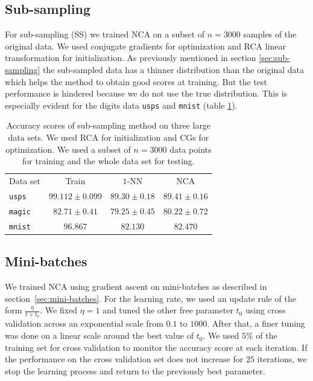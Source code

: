   \subsection{Sub-sampling}
  \label{subsec:eval-sub-sampling}

    For sub-sampling (SS) we trained NCA on a subset of $n=3000$ samples of the original data. We used conjugate gradients for optimization and RCA linear transformation for initialization. As previously mentioned in section \ref{sec:sub-sampling} the sub-sampled data has a thinner distribution than the original data which helps the method to obtain good scores at training. But the test performance is hindered because we do not use the true distribution. This is especially evident for the digits data \texttt{usps} and \texttt{mnist} (table \ref{tab:ss}). 
    \begin{table}
    	\centering
    	\begin{tabular}{lccc}
    	\toprule
    	Data set & Train & $1$-NN & NCA \\
    	\cmidrule(r){2-2}\cmidrule(r){3-3}\cmidrule(r){4-4} 
    	 \texttt{usps}&$99.112 \pm 0.099$&$89.30 \pm 0.18$&$89.41 \pm 0.16$\\
    	 \texttt{magic}&$82.71 \pm 0.41$&$79.25 \pm 0.45$&$80.22 \pm 0.72$\\
    	 \texttt{mnist}&$96.867$&$82.130$&$82.470$\\
    	 \bottomrule
    	\end{tabular}
	\label{tab:ss}
	\caption{Accuracy scores of sub-sampling method on three large data sets. We used RCA for initialization and CGs for optimization. We used a subset of $n=3000$ data points for training and the whole data set for testing.}
    \end{table}

    \subsection{Mini-batches}
    \label{subsec:eval-mini-batches}

    We trained NCA using gradient ascent on mini-batches as described in section~\ref{sec:mini-batches}. For the learning rate, we used an update rule of the form $\frac{\eta}{t+t_0}$. We fixed $\eta=1$ and tuned the other free parameter $t_0$ using cross validation across an exponential scale from $0.1$ to $1000$. After that, a finer tuning was done on a linear scale around the best value of $t_0$. We used $5\%$ of the training set for cross validation to monitor the accuracy score at each iteration. If the performance on the cross validation set does not increase for $25$ iterations, we stop the learning process and return to the previously best parameter.

